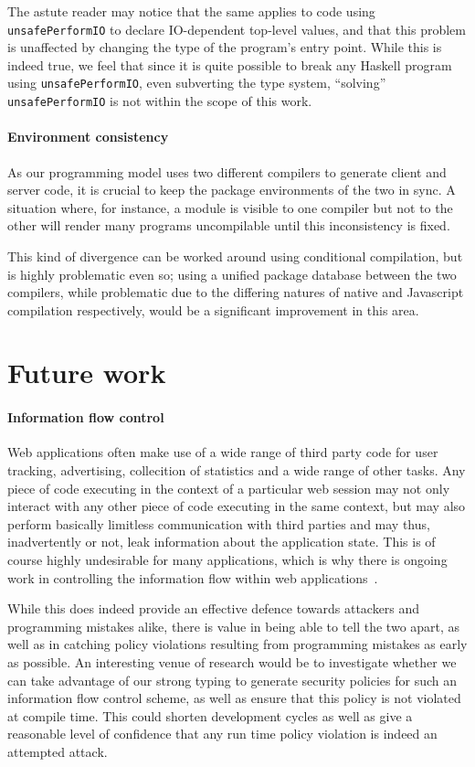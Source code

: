 \documentclass[preprint]{sigplanconf}
\begin{document}
The astute reader may notice that the same applies to code using
\lstinline!unsafePerformIO! to declare IO-dependent top-level values, and that
this problem is unaffected by changing the type of the program's entry point.
While this is indeed true, we feel that since it is quite possible to break
any Haskell program using \lstinline!unsafePerformIO!, even subverting the type
system, ``solving'' \lstinline!unsafePerformIO! is not within the scope of this
work.

\paragraph{Environment consistency} As our programming model uses two different
compilers to generate client and server code, it is crucial to keep the package
environments of the two in sync. A situation where, for instance, a module is
visible to one compiler but not to the other will render many programs
uncompilable until this inconsistency is fixed.

This kind of divergence can be worked around using conditional compilation, but
is highly problematic even so; using a unified package database between the two
compilers, while problematic due to the differing natures of native and
Javascript compilation respectively, would be a significant improvement in this
area.

\section{Future work}

\paragraph{Information flow control} Web applications often make use of a wide
range of third party code for user tracking, advertising, collecition of
statistics and a wide range of other tasks. Any piece of code executing in the
context of a particular web session may not only interact with any other piece
of code executing in the same context, but may also perform basically limitless
communication with third parties and may thus, inadvertently or not, leak
information about the application state. This is of course highly undesirable
for many applications, which is why there is ongoing work in controlling the
information flow within web applications\ \cite{jsflow}.

While this does indeed provide an effective defence towards attackers and
programming mistakes alike, there is value in being able to tell the two apart,
as well as in catching policy violations resulting from programming mistakes
as early as possible. An interesting venue of research would be to investigate
whether we can take advantage of our strong typing to generate security policies
for such an information flow control scheme, as well as ensure that this policy
is not violated at compile time. This could shorten development cycles as well
as give a reasonable level of confidence that any run time policy violation is
indeed an attempted attack.
\end{document}
